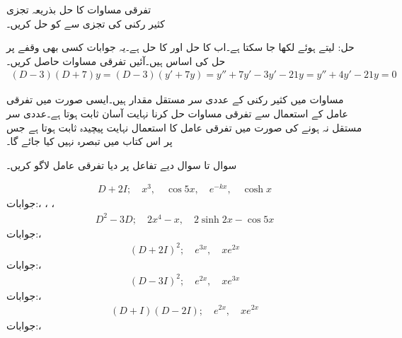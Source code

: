 \quad تفرقی مساوات کا حل بذریعہ تجزی\\
کثیر رکنی  کی تجزی سے  کو حل کریں۔

حل: لیتے ہوئے  لکھا جا سکتا ہے۔اب  کا حل  اور  کا حل  ہے۔یہ جوابات کسی بھی وقفے پر حل کی اساس ہیں۔آئیں تفرقی مساوات حاصل کریں۔
\begin{align*}
(D-3)(D+7)y=(D-3)(y'+7y)=y''+7y'-3y'-21y=y''+4y'-21y=0
\end{align*}

مساوات  میں کثیر رکنی کے عددی سر مستقل مقدار ہیں۔ایسی صورت میں تفرقی عامل کے استعمال سے تفرقی مساوات حل کرنا نہایت آسان ثابت ہوتا ہے۔عددی سر مستقل نہ ہونے کی صورت میں تفرقی عامل کا استعمال نہایت پیچیدہ ثابت ہوتا ہے جس پر اس کتاب میں تبصرہ نہیں کیا جائے گا۔


سوال  تا سوال  دیے تفاعل پر دیا تفرقی عامل لاگو کریں۔
  
\begin{align*}
D+2I; \quad x^3, \quad \cos 5x, \quad e^{-kx}, \quad \cosh x
\end{align*}
جوابات:، ، ، 
\begin{align*}
D^2-3D; \quad 2x^4-x, \quad 2\sinh 2x-\cos 5x
\end{align*}
جوابات:، 
\begin{align*}
(D+2I)^2; \quad e^{3x}, \quad xe^{2x}
\end{align*}
جوابات:، 
\begin{align*}
(D-3I)^2; \quad e^{2x}, \quad xe^{3x}
\end{align*}
جوابات:، 
\begin{align*}
(D+I)(D-2I); \quad e^{2x}, \quad xe^{2x}
\end{align*}
جوابات:، 

